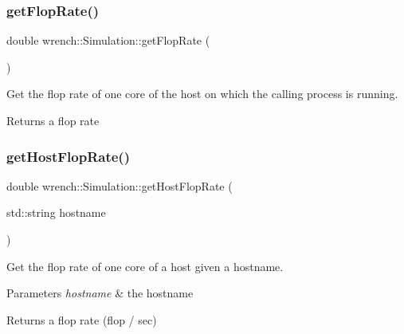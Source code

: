 \subsubsection{\texorpdfstring{get\+Flop\+Rate()}{getFlopRate()}}
{\footnotesize\ttfamily double wrench\+::\+Simulation\+::get\+Flop\+Rate (\begin{DoxyParamCaption}{ }\end{DoxyParamCaption})\hspace{0.3cm}{\ttfamily [static]}}



Get the flop rate of one core of the host on which the calling process is running. 

\begin{DoxyReturn}{Returns}
a flop rate 
\end{DoxyReturn}
\mbox{\label{classwrench_1_1_simulation_a736b72b8fb5343f93d3a461f85f221ef}} 
\subsubsection{\texorpdfstring{get\+Host\+Flop\+Rate()}{getHostFlopRate()}}
{\footnotesize\ttfamily double wrench\+::\+Simulation\+::get\+Host\+Flop\+Rate (\begin{DoxyParamCaption}\item[{std\+::string}]{hostname }\end{DoxyParamCaption})\hspace{0.3cm}{\ttfamily [static]}}



Get the flop rate of one core of a host given a hostname. 


\begin{DoxyParams}{Parameters}
{\em hostname} & the hostname \\
\hline
\end{DoxyParams}
\begin{DoxyReturn}{Returns}
a flop rate (flop / sec) 
\end{DoxyReturn}
\mbox{\label{classwrench_1_1_simulation_a757dde71d164a89ff52e49c4c52af0b5}} 
